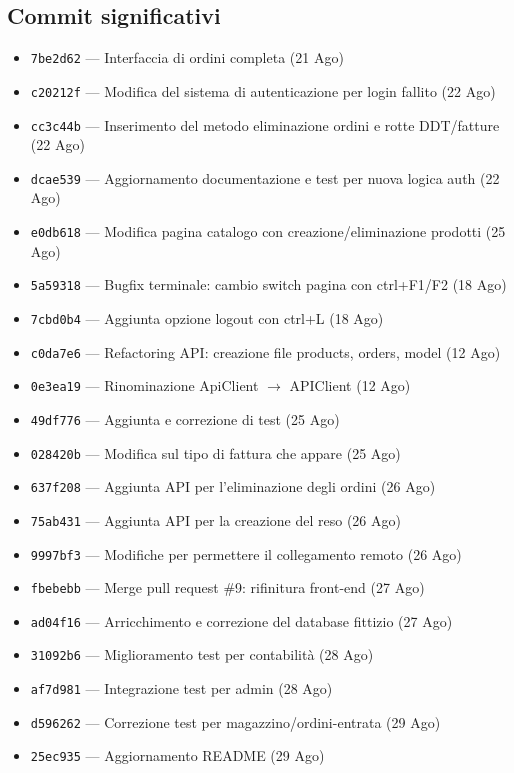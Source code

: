 \documentclass[a4paper,12pt]{article}
\begin{document}
\subsection*{Commit significativi}
\begin{itemize}
    \item \texttt{7be2d62} --- Interfaccia di ordini completa (21 Ago)
    \item \texttt{c20212f} --- Modifica del sistema di autenticazione per login fallito (22 Ago)
    \item \texttt{cc3c44b} --- Inserimento del metodo eliminazione ordini e rotte DDT/fatture (22 Ago)
    \item \texttt{dcae539} --- Aggiornamento documentazione e test per nuova logica auth (22 Ago)
    \item \texttt{e0db618} --- Modifica pagina catalogo con creazione/eliminazione prodotti (25 Ago)
    \item \texttt{5a59318} --- Bugfix terminale: cambio switch pagina con ctrl+F1/F2 (18 Ago)
    \item \texttt{7cbd0b4} --- Aggiunta opzione logout con ctrl+L (18 Ago)
    \item \texttt{c0da7e6} --- Refactoring API: creazione file products, orders, model (12 Ago)
    \item \texttt{0e3ea19} --- Rinominazione ApiClient $\to$ APIClient (12 Ago)
    \item \texttt{49df776} --- Aggiunta e correzione di test (25 Ago)
    \item \texttt{028420b} --- Modifica sul tipo di fattura che appare (25 Ago)
    \item \texttt{637f208} --- Aggiunta API per l'eliminazione degli ordini (26 Ago)
    \item \texttt{75ab431} --- Aggiunta API per la creazione del reso (26 Ago)
    \item \texttt{9997bf3} --- Modifiche per permettere il collegamento remoto (26 Ago)
    \item \texttt{fbebebb} --- Merge pull request \#9: rifinitura front-end (27 Ago)
    \item \texttt{ad04f16} --- Arricchimento e correzione del database fittizio (27 Ago)
    \item \texttt{31092b6} --- Miglioramento test per contabilit\`{a} (28 Ago)
    \item \texttt{af7d981} --- Integrazione test per admin (28 Ago)
    \item \texttt{d596262} --- Correzione test per magazzino/ordini-entrata (29 Ago)
    \item \texttt{25ec935} --- Aggiornamento README (29 Ago)
\end{itemize}
\end{document}
